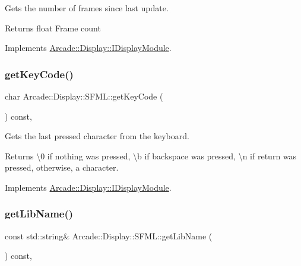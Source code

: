 Gets the number of frames since last update. 

\begin{DoxyReturn}{Returns}
float Frame count 
\end{DoxyReturn}


Implements \mbox{\hyperlink{classArcade_1_1Display_1_1IDisplayModule_aab078d82e6fdd32682553947c20226ac}{Arcade\+::\+Display\+::\+I\+Display\+Module}}.

\mbox{\label{classArcade_1_1Display_1_1SFML_ae2bf9e9c157a9f0ae8d1b60bd072e881}} 
\subsubsection{\texorpdfstring{getKeyCode()}{getKeyCode()}}
{\footnotesize\ttfamily char Arcade\+::\+Display\+::\+S\+F\+M\+L\+::get\+Key\+Code (\begin{DoxyParamCaption}{ }\end{DoxyParamCaption}) const\hspace{0.3cm}{\ttfamily [final]}, {\ttfamily [virtual]}}



Gets the last pressed character from the keyboard. 

\begin{DoxyReturn}{Returns}
\textbackslash{}0 if nothing was pressed, \textbackslash{}b if backspace was pressed, \textbackslash{}n if return was pressed, otherwise, a character. 
\end{DoxyReturn}


Implements \mbox{\hyperlink{classArcade_1_1Display_1_1IDisplayModule_a403f8a0f065dad707a881ef3cee79805}{Arcade\+::\+Display\+::\+I\+Display\+Module}}.

\mbox{\label{classArcade_1_1Display_1_1SFML_a8c323cea968403cb2edf791d37dc7887}} 
\subsubsection{\texorpdfstring{getLibName()}{getLibName()}}
{\footnotesize\ttfamily const std\+::string\& Arcade\+::\+Display\+::\+S\+F\+M\+L\+::get\+Lib\+Name (\begin{DoxyParamCaption}{ }\end{DoxyParamCaption}) const\hspace{0.3cm}{\ttfamily [final]}, {\ttfamily [virtual]}}




